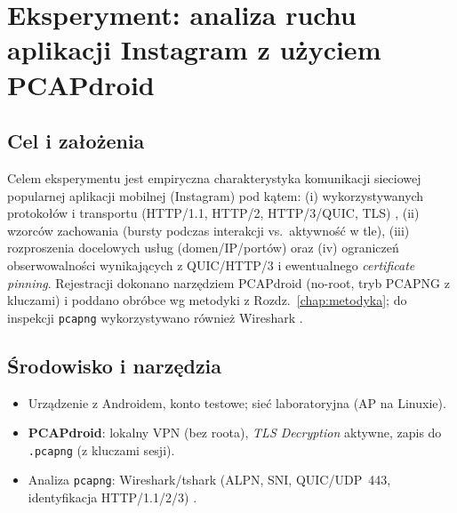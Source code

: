 
\chapter{Eksperyment: analiza ruchu aplikacji Instagram z użyciem PCAPdroid}
\label{chap:eksperyment-instagram}

\section{Cel i założenia}
Celem eksperymentu jest empiryczna charakterystyka komunikacji sieciowej popularnej aplikacji mobilnej (Instagram) pod kątem:
(i) wykorzystywanych protokołów i transportu (HTTP/1.1, HTTP/2, HTTP/3/QUIC, TLS) \cite{RFC8446,RFC9114,RFC9000},
(ii) wzorców zachowania (bursty podczas interakcji vs.\ aktywność w tle),
(iii) rozproszenia docelowych usług (domen/IP/portów) oraz
(iv) ograniczeń obserwowalności wynikających z QUIC/HTTP/3 i ewentualnego \emph{certificate pinning}.
Rejestracji dokonano narzędziem PCAPdroid (no-root, tryb PCAPNG z kluczami) i poddano obróbce wg metodyki z Rozdz.\ \ref{chap:metodyka}; do inspekcji \texttt{pcapng} wykorzystywano również Wireshark \cite{WiresharkDocs}.

\section{Środowisko i narzędzia}
\begin{itemize}
  \item Urządzenie z Androidem, konto testowe; sieć laboratoryjna (AP na Linuxie).
  \item \textbf{PCAPdroid}: lokalny VPN (bez roota), \emph{TLS Decryption} aktywne, zapis do \texttt{.pcapng} (z kluczami sesji).
  \item Analiza \texttt{pcapng}: Wireshark/tshark (ALPN, SNI, QUIC/UDP~443, identyfikacja HTTP/1.1/2/3) \cite{WiresharkDocs,RFC9114,RFC9000}.
\end{itemize}


